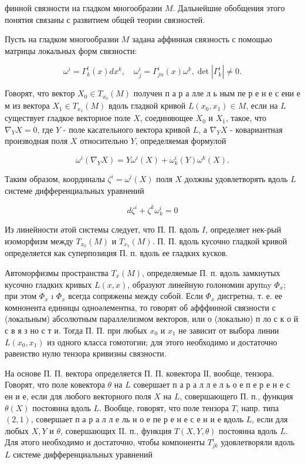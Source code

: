 \documentclass[10pt]{article}
\begin{document}
финной связности на гладком многообразии $M$. Дальнейшие обобщения этого понятия связаны с развитием общей теории связностей.

Пусть на гладком многообразии $M$ задана аффинная связность с помощью матрицы локальных форм связности:

\[
\omega^{i}=\Gamma_{k}^{l}(x) d x^{k}, \quad \omega_{j}^{i}=\Gamma_{j n}^{i}(x) \omega^{k}, \operatorname{det}\left|\Gamma_{k}^{i}\right| \neq 0 .
\]

Говорят, что вектор $X_{0} \in T_{x_{0}}(M)$ получен п а р а лле л ь ным пе р е н е с ени е м из вектора $X_{1} \in T_{x_{1}}(M)$ вдоль гладкой кривой $L\left(x_{0}, x_{1}\right) \in M$, если на $L$ существует гладкое векторное поле $X$, соединяющее $X_{0}$ и $X_{1}$, такое, что $\nabla_{Y} X=0$, где $Y$ - поле касательного вектора кривой $L$, а $\nabla_{Y} X$ - ковариантная производная поля $X$ относительно $Y$, определяемая формулой

\[
\omega^{i}\left(\nabla_{Y} X\right)=Y \omega^{i}(X)+\omega_{k}^{i}(Y) \omega^{k}(X) .
\]

Таким образом, координалы $\zeta^{i}=\omega^{i}(X)$ поля $X$ должны удовлетворять вдоль $L$ системе дифференциальных уравнений

\[
d \zeta^{i}+\zeta^{k} \omega_{k}^{i}=0
\]

Из линейности әтой системы следует, что П. П. вдоль $I$, определяет нек-рый изоморфизм между $T_{x_{0}}(M)$ и $T_{x_{1}}(M)$. П. П. вдоль кусочно гладкой кривой определяется как суперпозиция П. п. вдоль ее гладких кусков.

Автоморфизмы пространства $T_{x}(M)$, определяемые П. п. вдоль замкнутых кусочно гладких кривых $L(x, x)$, образуют линейную голономии арупny $\Phi_{x} ;$ при этом $\Phi_{x}$ ı $\Phi_{x}$ всегда сопряжены между собой. Если $\Phi_{x}$ дисгретна, т. е. ее комнонента единицы одноәлементна, то говорят об афффинной связности с (локальным) абсолютным параллелизмом векторов, или о (локально) п ло с к о й с в я з но с т и. Тогда П. П. при любых $x_{0}$ и $x_{1}$ не зависит от выбора линии $L\left(x_{0}, x_{1}\right)$ из одного класса гомотогии; для этого необходимо и достаточно равенство нулю тензора кривизны связности.

На основе П. П. вектора определяется П. П. ковектора ІІ, вообще, тензора. Говорят, что поле ковектора $\theta$ на $L$ совершает п а р а л л е л ь о е п е р е н е с ен и е, если для любого векторного поля $X$ на $L$, совершающего П. п., функция $\theta(X)$ постоянна вдоль $L$. Вообще, говорят, что поле тензора $T$, напр. типа $(2,1)$, совершает п а р а л л е ль н о е пе р е н е с е н и е вдоль $L$, если для любых $X, Y$ и $\theta$, совершающих II. п., функция $T(X, Y, \theta)$ постоянна вдоль $L$. Для әтого необходимо и достаточно, чтобы компоненты $T_{j k}^{i}$ удовлетворяли вдоль $L$ системе дифференциальных уравнений
\end{document}
